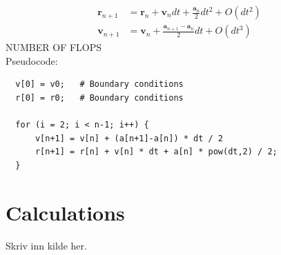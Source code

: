 \documentclass{article}
\begin{document}
\begin{align*}
    \mathbf{r}_{n+1}&=\mathbf{r}_n+\mathbf{v}_ndt+\frac{\mathbf{a}_n}{2}dt^2+O(dt^2)\\
    \mathbf{v}_{n+1}&=\mathbf{v}_n+\frac{\mathbf{a}_{n+1}-\mathbf{a}_n}{2}dt+O(dt^3)
\end{align*}
NUMBER OF FLOPS
\\
Pseudocode:

\begin{verbatim}
  v[0] = v0;   # Boundary conditions
  r[0] = r0;   # Boundary conditions

  for (i = 2; i < n-1; i++) {
      v[n+1] = v[n] + (a[n+1]-a[n]) * dt / 2
      r[n+1] = r[n] + v[n] * dt + a[n] * pow(dt,2) / 2;
  }

\end{verbatim}

\section{Calculations} 

\begin{thebibliography}{9}
	Skriv inn kilde her.
\end{thebibliography}
\end{document}
